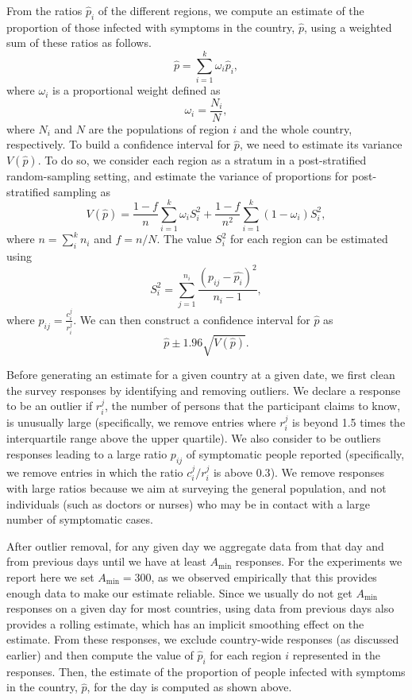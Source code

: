\documentclass[sigconf]{acmart}
\begin{document}
From the ratios $\hat{p}_i$ of the different regions, we compute an estimate of the proportion of those infected with symptoms in the country, $\hat{p}$, using a weighted sum of these ratios as follows.
$$
\hat{p} = \sum_{i=1}^k \omega_i \hat{p}_i,
$$
where $\omega_i$ is a proportional weight defined as 
$$
\omega_i = \frac{N_i}{N},
$$ 
where $N_i$ and $N$ are the populations of region $i$ and the whole country, respectively.  To build a confidence interval for $\hat{p}$, we need to estimate its variance  $V\left( \hat{p} \right)$. To do so, we consider each region as a stratum in a post-stratified random-sampling setting, and estimate the variance of proportions for post-stratified sampling \cite{Holt1979} as 
$$
V\left( \hat{p} \right) = \frac{1-f}{n} \sum_{i=1}^k \omega_iS_i^2 + \frac{1-f}{n^2} \sum_{i=1}^k (1-\omega_i)S_i^2,$$ 
where $n = \sum_i^k n_i$ and $f = n/N$. The value $S_i^2$ for each region can be estimated using
$$S_i^2= \sum_{j=1}^{n_i} \frac{(p_{ij}-\hat{p_i})^2 }{n_i-1},$$
where $p_{ij} =  \frac{c_{i}^j}{r_i^j}$. We can then construct a confidence interval for $\hat{p}$ as
$$\hat{p} \pm 1.96 \sqrt{V(\hat{p})}.$$

Before generating an estimate for a given country at a given date, we first clean the survey responses by identifying and removing outliers. We declare a response to be an outlier if  $r_i^j$, the number of persons that the participant claims to know, is unusually large (specifically, we remove entries where  $r_i^j$ is beyond 1.5 times the interquartile range above the upper quartile). We also consider to be outliers responses leading to a large ratio $p_{ij}$ of symptomatic people reported (specifically, we remove entries in which the ratio $c_{i}^j/r_i^j$ is above $0.3$). We remove responses with large ratios because we aim at surveying the general population, and not individuals (such as doctors or nurses) who may be in contact with a large number of symptomatic cases. 

After outlier removal, for any given day we aggregate data from that day and from previous days until we have at least $A_{\min}$ responses. For the experiments we report here we set $A_{\min} = 300$, as we observed  empirically that this provides enough data to make our estimate reliable. Since we usually do not get $A_{\min}$ responses on a given day for most countries, using data from previous days also provides a rolling estimate, which has an implicit smoothing effect on the estimate. From these responses, we exclude country-wide responses (as discussed earlier) and then compute the value of $\hat{p}_i$ for each region $i$ represented in the responses. Then, the estimate of the proportion of people infected with symptoms in the country, $\hat{p}$, for the day is computed as shown above. 
\end{document}
